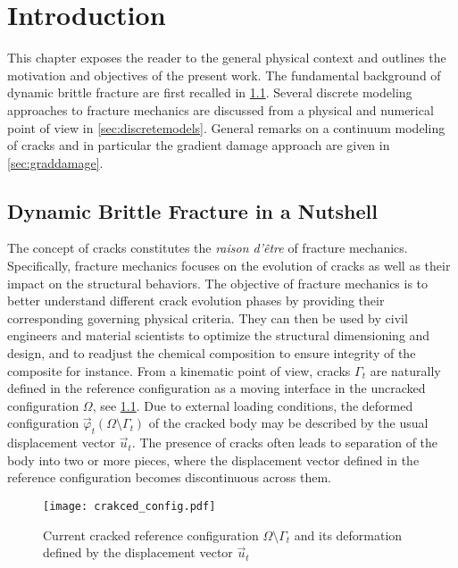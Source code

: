 \chapter{Introduction} \label{chap:introduction}
\minitoc

This chapter exposes the reader to the general physical context and outlines the motivation and objectives of the present work. The fundamental background of dynamic brittle fracture are first recalled in \cref{sec:dynafrac}. Several discrete modeling approaches to fracture mechanics are discussed from a physical and numerical point of view in \cref{sec:discretemodels}. General remarks on a continuum modeling of cracks and in particular the gradient damage approach are given in \cref{sec:graddamage}.

\section{Dynamic Brittle Fracture in a Nutshell} \label{sec:dynafrac}
The concept of cracks constitutes the \emph{raison d'être} of fracture mechanics. Specifically, fracture mechanics focuses on the evolution of cracks as well as their impact on the structural behaviors. The objective of fracture mechanics is to better understand different crack evolution phases by providing their corresponding governing physical criteria. They can then be used by civil engineers and material scientists to optimize the structural dimensioning and design, and to readjust the chemical composition to ensure integrity of the composite for instance. From a kinematic point of view, cracks $\Gamma_t$ are naturally defined in the reference configuration as a moving interface in the uncracked configuration $\Omega$, see \cref{fig:crackedconfig}. Due to external loading conditions, the deformed configuration $\vec{\varphi}_t(\Omega\setminus\Gamma_t)$ of the cracked body may be described by the usual displacement vector $\vec{u}_t$. The presence of cracks often leads to separation of the body into two or more pieces, where the displacement vector defined in the reference configuration becomes discontinuous across them.
\begin{figure}[htbp]
\centering
\texttt{[image: crakced\_config.pdf]}
\caption{Current cracked reference configuration $\Omega\setminus\Gamma_t$ and  its deformation defined by the displacement vector $\vec{u}_t$} \label{fig:crackedconfig}
\end{figure}

